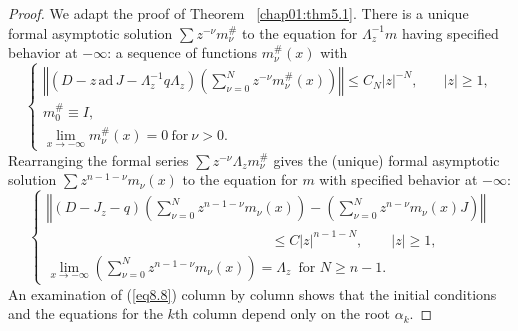 \documentclass{surv-l}
\theoremstyle{plain}
\theoremstyle{definition}
\numberwithin{equation}{chapter}
\begin{document}
\begin{proof}
We adapt the proof of Theorem ~\ref{chap01:thm5.1}. There is a unique formal asymptotic solution $\sum z^{-\nu}m_{\nu}^{\#}$ to the equation for $\Lambda_{z}^{-1}m$ having specified behavior at $-\infty$: a sequence of functions $m_{\nu}^{\#}(x)$ with
\setcounter{equation}{6}
\begin{equation}\label{eq8.7}
\left\{\begin{array}{ll}
\left\Vert (D-z\, \mathrm{ad}\, J-\Lambda_{z}^{-1}q\Lambda_{z})\left(\sum_{\nu=0}^{N}z^{-\nu}m_{\nu}^{\#}(x)\right)\right\Vert\leq C_{N}|z|^{-N}, &\quad |z|\geq 1,\\
m_{0}^{\#}\equiv I, & \\
\lim_{x\rightarrow-\infty}m_{\nu}^{\#}(x)=0\ \mathrm{for}\ \nu >0. &
\end{array}\right.
\end{equation}
Rearranging the formal series $\sum z^{-\nu}\Lambda_{z}m_{\nu}^{\#}$ gives the (unique) formal asymptotic solution $\sum z^{n-1-\nu}m_{\nu}(x)$ to the equation for $m$ with specified behavior at $-\infty$:
\begin{equation}\label{eq8.8}
\left\{\begin{array}{l}
\left\Vert(D-J_{z}-q)\left(\sum_{\nu=0}^{N}z^{n-1-\nu}m_{\nu}(x)\right)-\left(\sum_{\nu=0}^{N}z^{n-\nu}m_{\nu}(x)J\right)\right\Vert\\
\qquad\qquad\qquad\qquad\qquad\qquad\qquad\qquad\leq C|z|^{n-1-N},\qquad |z|\geq 1,\\
\lim_{x\rightarrow-\infty}\left(\sum_{\nu=0}^{N}z^{n-1-\nu}m_{\nu}(x)\right)=\Lambda_{z}\, \text{ for } N\geq n-1.
\end{array}\right.
\end{equation}
An examination of (\ref{eq8.8}) column by column shows that the initial conditions and the equations for the $k$th column depend only on the root $\alpha_{k}$.


\end{proof}
\end{document}
